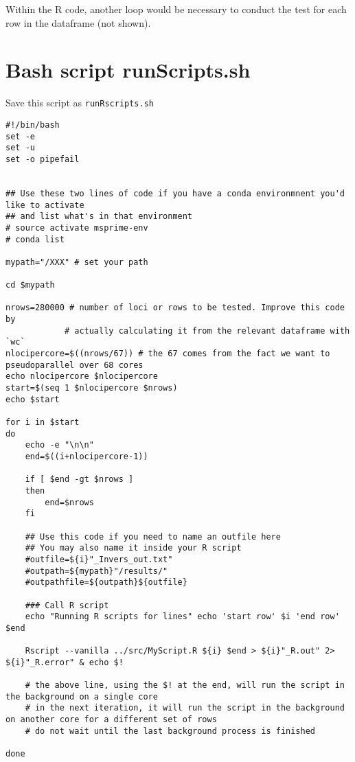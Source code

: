\documentclass[
  letterpaper,
  DIV=11,
  numbers=noendperiod]{scrreprt}
\begin{document}
Within the R code, another loop would be necessary to conduct the test
for each row in the dataframe (not shown).

\hypertarget{bash-script-runscripts.sh}{%
\section*{\texorpdfstring{\textbf{Bash script
runScripts.sh}}{Bash script runScripts.sh}}\label{bash-script-runscripts.sh}}

Save this script as \texttt{runRscripts.sh}

\begin{verbatim}
#!/bin/bash
set -e
set -u
set -o pipefail


## Use these two lines of code if you have a conda environmnent you'd like to activate
## and list what's in that environment
# source activate msprime-env
# conda list

mypath="/XXX" # set your path

cd $mypath

nrows=280000 # number of loci or rows to be tested. Improve this code by
            # actually calculating it from the relevant dataframe with `wc`
nlocipercore=$((nrows/67)) # the 67 comes from the fact we want to pseudoparallel over 68 cores
echo nlocipercore $nlocipercore
start=$(seq 1 $nlocipercore $nrows)
echo $start

for i in $start
do
    echo -e "\n\n"
    end=$((i+nlocipercore-1))
    
    if [ $end -gt $nrows ]
    then
        end=$nrows
    fi
    
    ## Use this code if you need to name an outfile here
    ## You may also name it inside your R script
    #outfile=${i}"_Invers_out.txt"
    #outpath=${mypath}"/results/"
    #outpathfile=${outpath}${outfile}
    
    ### Call R script
    echo "Running R scripts for lines" echo 'start row' $i 'end row' $end
    
    Rscript --vanilla ../src/MyScript.R ${i} $end > ${i}"_R.out" 2> ${i}"_R.error" & echo $!
    
    # the above line, using the $! at the end, will run the script in the background on a single core
    # in the next iteration, it will run the script in the background on another core for a different set of rows
    # do not wait until the last background process is finished
    
done
\end{verbatim}
\end{document}
